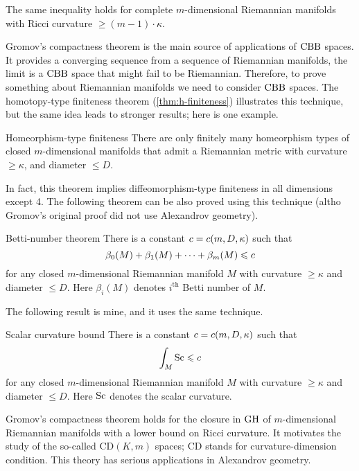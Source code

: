 The same inequality holds for complete $m$-dimensional Riemannian manifolds with Ricci curvature $\ge (m-1)\cdot \kappa$.

Gromov's compactness theorem is the main source of applications of $\mathrm{CBB}$ spaces.
It provides a converging sequence from a sequence of Riemannian manifolds, the limit is a $\mathrm{CBB}$ space that might fail to be Riemannian.
Therefore, to prove something about Riemannian manifolds we need to consider $\mathrm{CBB}$ spaces.
The homotopy-type finiteness theorem (\ref{thm:h-finiteness}) illustrates this technique,
but the same idea leads to stronger results; here is one example.

\begin{thm}{Homeorphism-type finiteness}
There are only finitely many homeorphism types of closed $m$-dimensional manifolds that admit a Riemannian metric with curvature $\ge \kappa$, and diameter $\le D$.
\end{thm}

In fact, this theorem implies diffeomorphism-type finiteness in all dimensions except 4.
The following theorem can be also proved using this technique (altho Gromov's original proof \cite{gromov-1981} did not use Alexandrov geometry).

\begin{thm}{Betti-number theorem}
There is a constant $c=c(m,D,\kappa)$ such that 
\[\beta_0(M)+\beta_1(M)+\dots+\beta_m(M)\leqslant c\]
for any closed $m$-dimensional Riemannian manifold $M$ with curvature $\ge \kappa$ and diameter $\le D$.
Here $\beta_i(M)$ denotes $i^\text{th}$ Betti number of $M$.
\end{thm}

The following result is mine, and it uses the same technique.

\begin{thm}{Scalar curvature bound}
There is a constant $c=c(m,D,\kappa)$ such that 
\[\int_M\mathrm{Sc}\leqslant c\]
for any closed $m$-dimensional Riemannian manifold $M$ with curvature $\ge \kappa$ and diameter $\le D$.
Here $\mathrm{Sc}$ denotes the scalar curvature.
\end{thm}

Gromov's compactness theorem holds for the closure in $\operatorname{\rm GH}\nolimits$ of $m$-dimensional Riemannian manifolds with a lower bound on Ricci curvature.
It motivates the study of the so-called $\mathrm{CD}(K,m)$ spaces; $\mathrm{CD}$ stands for curvature-dimension condition.
This theory has serious applications in Alexandrov geometry.
